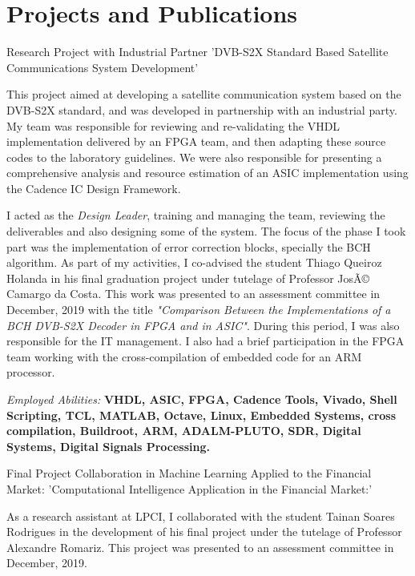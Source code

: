 \documentclass[a4paper]{twentysecondcv} %
\begin{document}
\section{Projects and Publications}
\begin{twenty}
\twentyitem
{Research Project with Industrial Partner}
{'DVB-S2X Standard Based Satellite Communications System Development'}
{}
{\hspace{8pt} This project aimed at developing a satellite communication system based on the DVB-S2X standard, and was developed in partnership with an industrial party. My team was responsible for reviewing and re-validating the VHDL implementation delivered by an FPGA team, and then adapting these source codes to the laboratory guidelines. We were also responsible for presenting a comprehensive analysis and resource estimation of an ASIC implementation using the Cadence IC Design Framework. 

\hspace{8pt}I acted as the \textit{Design Leader}, training and managing the team, reviewing the deliverables and also designing some of the system. The focus of the phase I took part was the implementation of error correction blocks, specially the BCH algorithm. As part of my activities, I co-advised the student Thiago Queiroz Holanda in his final graduation project under tutelage of Professor JosÃ© Camargo da Costa. This work was presented to an assessment committee in December, 2019 with the title \textit{"Comparison Between the Implementations of a BCH DVB-S2X Decoder in FPGA and in ASIC"}. During this period, I was also responsible for the IT management. I also had a brief participation in the FPGA team working with the cross-compilation of embedded code for an ARM processor.

\hspace{8pt}\textit{Employed Abilities: } \textbf{VHDL, ASIC, FPGA, Cadence Tools, Vivado, Shell Scripting, TCL, MATLAB, Octave, Linux, Embedded Systems, cross compilation, Buildroot, ARM, ADALM-PLUTO, SDR, Digital Systems, Digital Signals Processing.\\}}


\twentyitem
{Final Project Collaboration in Machine Learning Applied to the Financial Market:}
{'Computational Intelligence Application in the Financial Market:'}
{}
{\hspace{8pt} As a research assistant at LPCI, I collaborated with the student Tainan Soares Rodrigues in the development of his final project under the tutelage of Professor Alexandre Romariz. This project was presented to an assessment committee in December, 2019.

}
\end{twenty}
\end{document}
